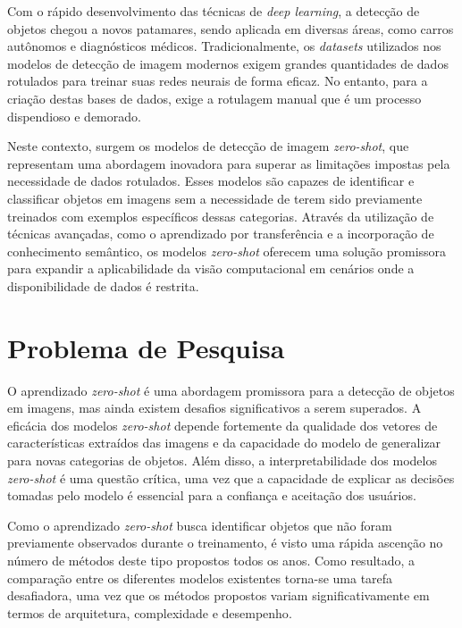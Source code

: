 \documentclass[openany, a4paper,12pt, oneside]{article}
\begin{document}
Com o r\'{a}pido desenvolvimento das t\'{e}cnicas de \textit{deep learning}, a detec\c{c}\~{a}o de objetos chegou a novos patamares\cite{nature14539}, sendo aplicada em diversas \'{a}reas, como carros aut\^{o}nomos \cite{cordts2016} e diagn\'{o}sticos m\'{e}dicos\cite{dong2017}. Tradicionalmente, os \textit{datasets} utilizados nos modelos de detecção de imagem modernos exigem grandes quantidades de dados rotulados para treinar suas redes neurais de forma eficaz. No entanto, para a cria\c{c}\~{a}o destas bases de dados, exige a rotulagem manual que é um processo dispendioso e demorado\cite{shankar2017}\cite{cordts2016}.

Neste contexto, surgem os modelos de detecção de imagem \textit{zero-shot}, que representam uma abordagem inovadora para superar as limitações impostas pela necessidade de dados rotulados. Esses modelos são capazes de identificar e classificar objetos em imagens sem a necessidade de terem sido previamente treinados com exemplos específicos dessas categorias\cite{Bansal_2018_ECCV}. Através da utilização de técnicas avançadas, como o aprendizado por transferência\cite{Qi2011}\cite{fu2017} e a incorporação de conhecimento semântico\cite{joulin2016}\cite{mikolov2013}, os modelos \textit{zero-shot} oferecem uma solução promissora para expandir a aplicabilidade da visão computacional em cenários onde a disponibilidade de dados é restrita.

\section{Problema de Pesquisa}

O aprendizado \textit{zero-shot} é uma abordagem promissora para a detecção de objetos em imagens, mas ainda existem desafios significativos a serem superados. A eficácia dos modelos \textit{zero-shot} depende fortemente da qualidade dos vetores de características extraídos das imagens e da capacidade do modelo de generalizar para novas categorias de objetos. Além disso, a interpretabilidade dos modelos \textit{zero-shot} é uma questão crítica, uma vez que a capacidade de explicar as decisões tomadas pelo modelo é essencial para a confiança e aceitação dos usuários\cite{Bansal_2018_ECCV}.

Como o aprendizado \textit{zero-shot} busca identificar objetos que n\~{a}o foram previamente observados durante o treinamento\cite{lampert2014}\cite{Rohrbach2011}, \'{e} visto uma r\'{a}pida ascen\c{c}\~{a}o no n\'{u}mero de m\'{e}todos deste tipo propostos todos os anos. Como resultado, a compara\c{c}\~{a}o entre os diferentes modelos existentes torna-se uma tarefa desafiadora, uma vez que os métodos propostos variam significativamente em termos de arquitetura, complexidade e desempenho\cite{xian2020}.
\end{document}
